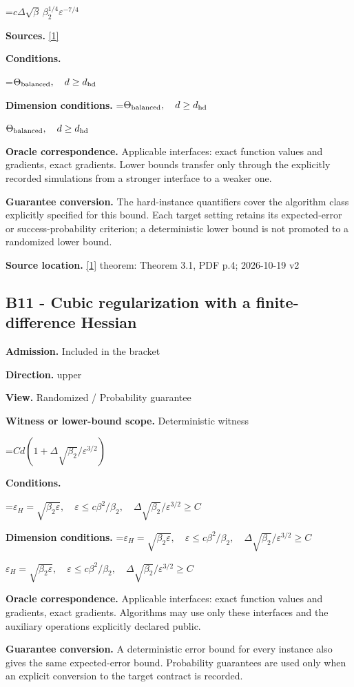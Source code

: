 \documentclass[10pt,a4paper]{article}
\newcommand{\AtlasMath}[1]{\par\begingroup\centering\setbox0=\hbox{$\displaystyle #1$}\ifdim\wd0>1.4\linewidth\typeout{ATLAS WIDE FORMULA: \the\wd0}\fi\ifdim\wd0>\linewidth\resizebox{\linewidth}{!}{\box0}\else\box0\fi\par\endgroup}
\newcommand{\AtlasInlineMath}[1]{\begingroup\setbox0=\hbox{$#1$}\ifdim\wd0>.4\linewidth\endgroup\AtlasMath{#1}\else\endgroup$#1$\fi}
\begin{document}
\AtlasMath{c\Delta\sqrt\beta\,\beta_2^{1/4}\varepsilon^{-7/4}}
\textbf{Sources.} \href{https://arxiv.org/pdf/2610.00245v2}{[1]}

\textbf{Conditions.} 
\AtlasMath{\Theta_{\rm balanced},\quad d\ge d_{\rm hd}}


\textbf{Dimension conditions.} \AtlasInlineMath{\Theta_{\rm balanced},\quad d\ge d_{\rm hd}}

\textbf{Oracle correspondence.} Applicable interfaces: exact function values and gradients, exact gradients. Lower bounds transfer only through the explicitly recorded simulations from a stronger interface to a weaker one.

\textbf{Guarantee conversion.} The hard-instance quantifiers cover the algorithm class explicitly specified for this bound. Each target setting retains its expected-error or success-probability criterion; a deterministic lower bound is not promoted to a randomized lower bound.

\textbf{Source location.} \href{https://arxiv.org/pdf/2610.00245v2}{[1]} theorem: Theorem 3.1, PDF p.4; 2026-10-19 v2

\subsection{B11 - Cubic regularization with a finite-difference Hessian}
\textbf{Admission.} Included in the bracket

\textbf{Direction.} upper

\textbf{View.} Randomized / Probability guarantee

\textbf{Witness or lower-bound scope.} Deterministic witness

\AtlasMath{Cd(1+\Delta\sqrt{\beta_2}/\varepsilon^{3/2})}
\textbf{Conditions.} 
\AtlasMath{\varepsilon_H=\sqrt{\beta_2\varepsilon},\quad\varepsilon\le c\beta^2/\beta_2,\quad\Delta\sqrt{\beta_2}/\varepsilon^{3/2}\ge C}


\textbf{Dimension conditions.} \AtlasInlineMath{\varepsilon_H=\sqrt{\beta_2\varepsilon},\quad\varepsilon\le c\beta^2/\beta_2,\quad\Delta\sqrt{\beta_2}/\varepsilon^{3/2}\ge C}

\textbf{Oracle correspondence.} Applicable interfaces: exact function values and gradients, exact gradients. Algorithms may use only these interfaces and the auxiliary operations explicitly declared public.

\textbf{Guarantee conversion.} A deterministic error bound for every instance also gives the same expected-error bound. Probability guarantees are used only when an explicit conversion to the target contract is recorded.
\end{document}
